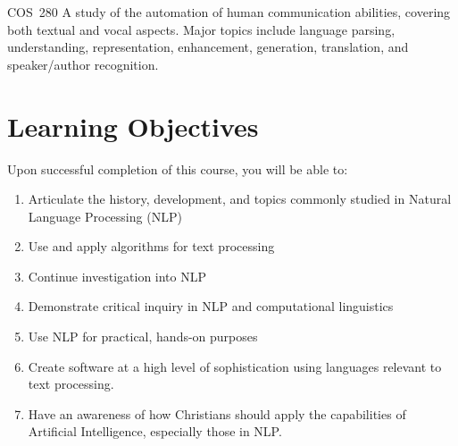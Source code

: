 \documentclass[11pt]{article}
\begin{document}




\tableofcontents

\begin{catalogentry}{COS~280}
  A study of the automation of human communication abilities,
  covering both textual and vocal aspects.
  Major topics include language parsing, understanding, representation,
  enhancement, generation, translation,
  and speaker/author recognition.
\end{catalogentry}

\section{Learning Objectives}

Upon successful completion of this course,
you will be able to:
\begin{enumerate}
\item Articulate the history, development, and topics
  commonly studied in Natural Language Processing (NLP)
\item Use and apply algorithms for text processing
\item Continue investigation into NLP
\item Demonstrate critical inquiry in NLP and computational linguistics
\item Use NLP for practical, hands-on purposes
\item Create software at a high level of sophistication
  using languages relevant to text processing.
\item Have an awareness of how Christians should apply the capabilities
  of Artificial Intelligence, especially those in NLP.
\end{enumerate}
\end{document}

